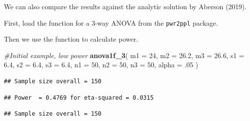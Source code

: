 \documentclass[]{book}
\newenvironment{Shaded}{\begin{snugshade}}{\end{snugshade}}
\newcommand{\CommentTok}[1]{\textcolor[rgb]{0.56,0.35,0.01}{\textit{#1}}}
\newcommand{\DataTypeTok}[1]{\textcolor[rgb]{0.13,0.29,0.53}{#1}}
\newcommand{\DecValTok}[1]{\textcolor[rgb]{0.00,0.00,0.81}{#1}}
\newcommand{\FloatTok}[1]{\textcolor[rgb]{0.00,0.00,0.81}{#1}}
\newcommand{\KeywordTok}[1]{\textcolor[rgb]{0.13,0.29,0.53}{\textbf{#1}}}
\newcommand{\NormalTok}[1]{#1}
\begin{document}
We can also compare the results against the analytic solution by Aberson (2019).

First, load the function for a 3-way ANOVA from the \texttt{pwr2ppl} package.

Then we use the function to calculate power.

\begin{Shaded}
\begin{Highlighting}[]
\CommentTok{#Initial example, low power}
\KeywordTok{anova1f_3}\NormalTok{(}
\DataTypeTok{m1 =} \DecValTok{24}\NormalTok{,}
\DataTypeTok{m2 =} \FloatTok{26.2}\NormalTok{,}
\DataTypeTok{m3 =} \FloatTok{26.6}\NormalTok{,}
\DataTypeTok{s1 =} \FloatTok{6.4}\NormalTok{,}
\DataTypeTok{s2 =} \FloatTok{6.4}\NormalTok{,}
\DataTypeTok{s3 =} \FloatTok{6.4}\NormalTok{,}
\DataTypeTok{n1 =} \DecValTok{50}\NormalTok{,}
\DataTypeTok{n2 =} \DecValTok{50}\NormalTok{,}
\DataTypeTok{n3 =} \DecValTok{50}\NormalTok{,}
\DataTypeTok{alpha =} \FloatTok{.05}
\NormalTok{)}
\end{Highlighting}
\end{Shaded}

\begin{verbatim}
## Sample size overall = 150
\end{verbatim}

\begin{verbatim}
## Power  = 0.4769 for eta-squared = 0.0315
\end{verbatim}

\begin{Shaded}
\end{Shaded}

\begin{verbatim}
## Sample size overall = 150
\end{verbatim}
\end{document}
